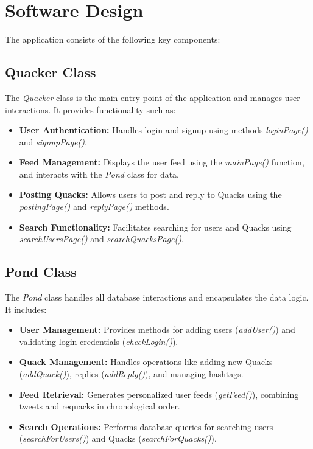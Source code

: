 \documentclass[letterpaper, 11pt]{article}
\begin{document}
\section{Software Design}
The application consists of the following key components:

	\subsection*{Quacker Class}
	The \textit{Quacker} class is the main entry point of the application and manages user interactions. It provides functionality such as:
	\begin{itemize}
		\item \textbf{User Authentication:} Handles login and signup using methods \textit{loginPage()} and \textit{signupPage()}.
		\item \textbf{Feed Management:} Displays the user feed using the \textit{mainPage()} function, and interacts with the \textit{Pond} class for data.
		\item \textbf{Posting Quacks:} Allows users to post and reply to Quacks using the \textit{postingPage()} and \textit{replyPage()} methods.
		\item \textbf{Search Functionality:} Facilitates searching for users and Quacks using \textit{searchUsersPage()} and \textit{searchQuacksPage()}.
	\end{itemize}

	\subsection*{Pond Class}
	The \textit{Pond} class handles all database interactions and encapsulates the data logic. It includes:
	\begin{itemize}
		\item \textbf{User Management:} Provides methods for adding users (\textit{addUser()}) and validating login credentials (\textit{checkLogin()}).
		\item \textbf{Quack Management:} Handles operations like adding new Quacks (\textit{addQuack()}), replies (\textit{addReply()}), and managing hashtags.
		\item \textbf{Feed Retrieval:} Generates personalized user feeds (\textit{getFeed()}), combining tweets and requacks in chronological order.
		\item \textbf{Search Operations:} Performs database queries for searching users (\textit{searchForUsers()}) and Quacks (\textit{searchForQuacks()}).
	\end{itemize}
\end{document}
